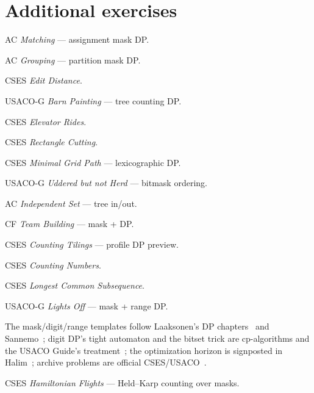 \section{Additional exercises}
\begin{exercise}[easy] AC \emph{Matching} --- assignment mask DP. \end{exercise}
\begin{exercise}[easy] AC \emph{Grouping} --- partition mask DP. \end{exercise}
\begin{exercise}[easy] CSES \emph{Edit Distance}. \end{exercise}
\begin{exercise}[easy] USACO-G \emph{Barn Painting} --- tree counting DP. \end{exercise}
\begin{exercise}[medium] CSES \emph{Elevator Rides}. \end{exercise}
\begin{exercise}[medium] CSES \emph{Rectangle Cutting}. \end{exercise}
\begin{exercise}[medium] CSES \emph{Minimal Grid Path} --- lexicographic DP. \end{exercise}
\begin{exercise}[medium] USACO-G \emph{Uddered but not Herd} --- bitmask ordering. \end{exercise}
\begin{exercise}[medium] AC \emph{Independent Set} --- tree in/out. \end{exercise}
\begin{exercise}[medium] CF \emph{Team Building} --- mask + DP. \end{exercise}
\begin{exercise}[hard] CSES \emph{Counting Tilings} --- profile DP preview. \end{exercise}
\begin{exercise}[hard] CSES \emph{Counting Numbers}. \end{exercise}
\begin{exercise}[hard] CSES \emph{Longest Common Subsequence}. \end{exercise}
\begin{exercise}[hard] USACO-G \emph{Lights Off} --- mask + range DP. \end{exercise}

\chapternotes
The mask/digit/range templates follow Laaksonen's DP
chapters~\cite{laaksonen2024} and Sannemo~\cite{sannemo2025}; digit
DP's tight automaton and the bitset trick are cp-algorithms and the
USACO Guide's treatment~\cite{usacoguide,cpalgorithms}; the
optimization horizon is signposted in Halim~\cite{halimcp4}; archive
problems are official CSES/USACO~\cite{cses}.
\begin{exercise}[hard] CSES \emph{Hamiltonian Flights} --- Held--Karp counting over masks. \end{exercise}

